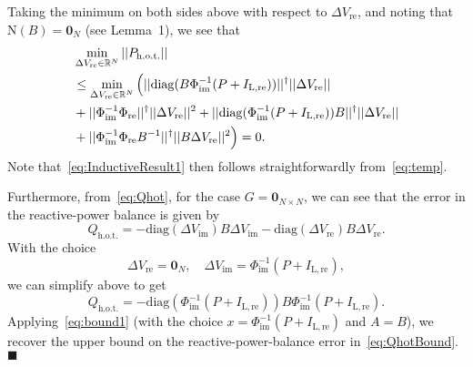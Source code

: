 \documentclass[10 pt, conference]{ieeeconf}
\newcommand{\qedblack}{\hfill \ensuremath{\blacksquare}}
\begin{document}
Taking the minimum on both sides above with respect to $\Delta V_\mathrm{re}$, and noting that $\mathrm{N}(B) = \mathbf{0}_N$ (see Lemma~1), we see that
\begin{align} \label{eq:temp}
&\min_{\Delta V_\mathrm{re} \in \mathbb{R}^N}||P_\mathrm{h.o.t.}|| \nonumber \\
&\leq \min_{\Delta V_\mathrm{re} \in \mathbb{R}^N} \Big(||\mathrm{diag}(B\Phi_\mathrm{im}^{-1}(P+I_\mathrm{L,re}))||^\dagger ||\Delta V_\mathrm{re}|| \nonumber \\
&\hspace{-0.0in}+||\Phi_\mathrm{im}^{-1}\Phi_\mathrm{re}||^\dagger ||\Delta V_\mathrm{re}||^2 + ||\mathrm{diag}(\Phi_\mathrm{im}^{-1}(P+I_\mathrm{L,re})) B||^\dagger ||\Delta V_\mathrm{re}|| \nonumber \\
&\hspace{-0.0in}+ ||\Phi_\mathrm{im}^{-1}\Phi_\mathrm{re} B^{-1}||^\dagger ||B \Delta V_\mathrm{re}||^2\Big) = 0. 
\end{align}
Note that~\eqref{eq:InductiveResult1} then follows straightforwardly from~\eqref{eq:temp}.

Furthermore, from~\eqref{eq:Qhot}, for the case $G = \mathbf{0}_{N \times N}$, we can see that the error in the reactive-power balance is given by
\begin{equation}
Q_\mathrm{h.o.t.} = -\mathrm{diag}(\Delta V_\mathrm{im}) B \Delta V_\mathrm{im} - \mathrm{diag}(\Delta V_\mathrm{re}) B \Delta V_\mathrm{re}.
\end{equation}
With the choice 
\begin{equation}
\Delta V_\mathrm{re} = \mathbf{0}_N, \quad \Delta V_\mathrm{im} = \Phi_\mathrm{im}^{-1}(P + I_\mathrm{L,re}), 
\end{equation}
we can simplify above to get 
\begin{equation}
Q_\mathrm{h.o.t.} = -\mathrm{diag}(\Phi_\mathrm{im}^{-1} (P + I_\mathrm{L,re})) B \Phi_\mathrm{im}^{-1} (P + I_\mathrm{L,re}).
\end{equation}
Applying~\eqref{eq:bound1} (with the choice $x = \Phi_\mathrm{im}^{-1} (P + I_\mathrm{L,re})$ and $A = B$), we recover the upper bound on the reactive-power-balance error in~\eqref{eq:QhotBound}.
\qedblack
\end{document}

